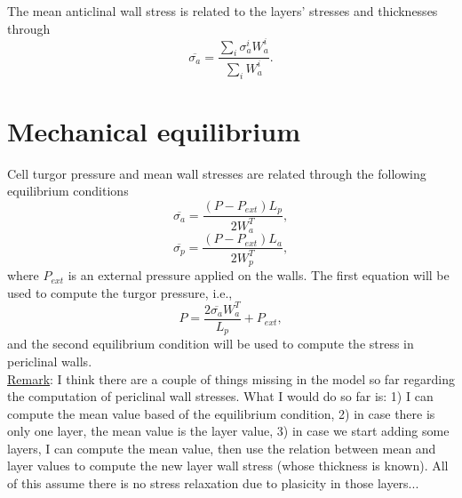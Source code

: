 \documentclass[]{article}
\begin{document}
The mean anticlinal wall stress is related to the layers' stresses and thicknesses through
\begin{equation}
	\overline{\sigma_a}=\frac{\sum_i \sigma_a^i W_a^i}{\sum_i W_a^i}.
\end{equation}
\section{Mechanical equilibrium}
Cell turgor pressure and mean wall stresses are related through the following equilibrium conditions
\begin{equation}
	\overline{\sigma_a}=\frac{(P-P_{ext})L_p}{2W_a^T},
\end{equation}
\begin{equation}
	\overline{\sigma_p}=\frac{(P-P_{ext})L_a}{2W_p^T},
\end{equation}
where $P_{ext}$ is an external pressure applied on the walls. The first equation will be used to compute the turgor pressure, i.e.,
\begin{equation}
	P=\frac{2\overline{\sigma_a}W_a^T}{L_p} + P_{ext},
\end{equation}
and the second equilibrium condition will be used to compute the stress in periclinal walls.\\


\underline{Remark}: I think there are a couple of things missing in the model so far regarding the computation of periclinal wall stresses. What I would do so far is: 1) I can compute the mean value based of the equilibrium condition, 2) in case there is only one layer, the mean value is the layer value, 3) in case we start adding some layers, I can compute the mean value, then use the relation between mean and layer values to compute the new layer wall stress (whose thickness is known). All of this assume there is no stress relaxation due to plasicity in those layers...
\end{document}
